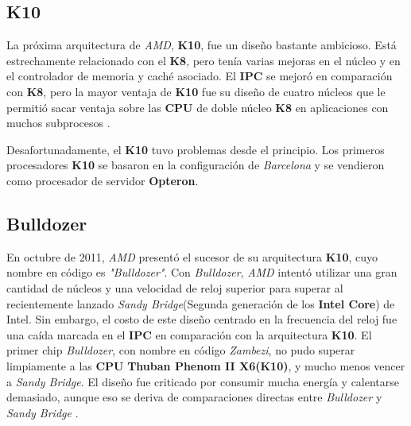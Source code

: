 \subsection{K10}
La próxima arquitectura de \emph{AMD}, \textbf{K10}, fue un diseño bastante ambicioso. Está estrechamente relacionado con el \textbf{K8}, pero tenía varias mejoras en el núcleo y en el controlador de memoria y caché asociado. 
El \textbf{IPC} se mejoró en comparación con \textbf{K8}, pero la mayor ventaja de \textbf{K10} fue su diseño de cuatro núcleos que le permitió sacar ventaja sobre las \textbf{CPU} de doble núcleo \textbf{K8} en aplicaciones con muchos subprocesos
.

Desafortunadamente, el \textbf{K10} tuvo problemas desde el principio. Los primeros procesadores \textbf{K10} se basaron en la configuración de \emph{Barcelona} y se vendieron como procesador de servidor \textbf{Opteron}.

\subsection{Bulldozer}
En octubre de 2011, \emph{AMD} presentó el sucesor de su arquitectura \textbf{K10}, cuyo nombre en código es \emph{"Bulldozer"}. Con \emph{Bulldozer}, \emph{AMD} intentó utilizar una gran cantidad 
de núcleos y una velocidad de reloj superior para superar al recientemente lanzado \emph{Sandy Bridge}(Segunda generación de los \textbf{Intel Core}) de Intel. Sin embargo, el costo de este diseño 
centrado en la frecuencia del reloj fue una caída marcada en el \textbf{IPC} en comparación con la arquitectura \textbf{K10}. El primer chip \emph{Bulldozer}, con nombre en código \emph{Zambezi}, no pudo superar 
limpiamente a las \textbf{CPU} \textbf{Thuban Phenom II X6(K10)}, y mucho menos vencer a \emph{Sandy Bridge}.
El diseño fue criticado por consumir mucha energía y calentarse demasiado, aunque eso se deriva de comparaciones directas entre \emph{Bulldozer} y \emph{Sandy Bridge}
.

